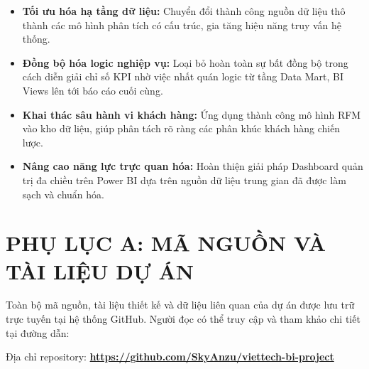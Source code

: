 \documentclass[12pt,a4paper]{article}
\begin{document}
\begin{itemize}
    \item \textbf{Tối ưu hóa hạ tầng dữ liệu:} Chuyển đổi thành công nguồn dữ liệu thô thành các mô hình phân tích có cấu trúc, gia tăng hiệu năng truy vấn hệ thống.
    \item \textbf{Đồng bộ hóa logic nghiệp vụ:} Loại bỏ hoàn toàn sự bất đồng bộ trong cách diễn giải chỉ số KPI nhờ việc nhất quán logic từ tầng Data Mart, BI Views lên tới báo cáo cuối cùng.
    \item \textbf{Khai thác sâu hành vi khách hàng:} Ứng dụng thành công mô hình RFM vào kho dữ liệu, giúp phân tách rõ ràng các phân khúc khách hàng chiến lược.
    \item \textbf{Nâng cao năng lực trực quan hóa:} Hoàn thiện giải pháp Dashboard quản trị đa chiều trên Power BI dựa trên nguồn dữ liệu trung gian đã được làm sạch và chuẩn hóa.
\end{itemize}

\clearpage
\section{PHỤ LỤC A: MÃ NGUỒN VÀ TÀI LIỆU DỰ ÁN}

Toàn bộ mã nguồn, tài liệu thiết kế và dữ liệu liên quan của dự án được lưu trữ trực tuyến tại hệ thống GitHub. Người đọc có thể truy cập và tham khảo chi tiết tại đường dẫn:

Địa chỉ repository: \href{https://github.com/SkyAnzu/viettech-bi-project}{\textbf{https://github.com/SkyAnzu/viettech-bi-project}}
\end{document}
